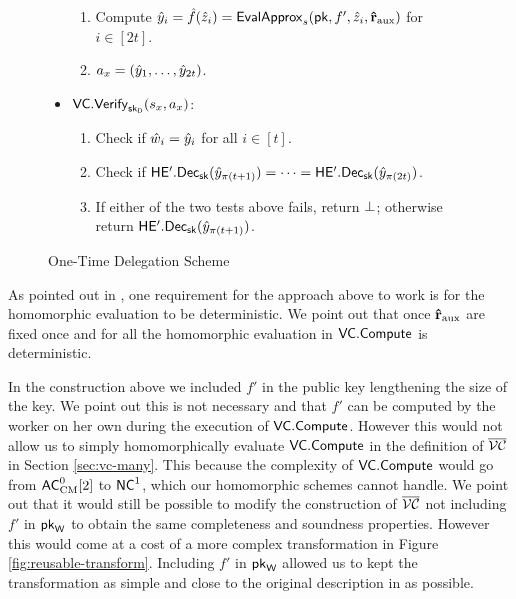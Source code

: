 \begin{figure}
\begin{framed}
\begin{itemize}
\begin{enumerate}
\item Compute $\hat{y}_i = \hat{f}(\hat{z}_i) = \mathsf{EvalApprox}_s(\mathsf{pk}, f', \hat{z}_i, \mathbf{\hat{r}}_{\text{aux}})$ for $i \in [2t]$.
\item $a_x = (\hat{y}_1,\dots,\hat{y}_{2t})$.
\end{enumerate}
\item $\mathsf{VC.Verify}_{\mathsf{sk}_{\mathsf{D}}}(s_x, a_x)$:
\begin{enumerate}
\item Check if $\hat{w}_i = \hat{y}_i$ for all $i \in [t]$.
\item Check if $\mathsf{HE'.Dec}_{\mathsf{sk}}(\hat{y}_{\pi(t+1)}) = \dots = \mathsf{HE'.Dec}_{\mathsf{sk}}(\hat{y}_{\pi(2t)})$.
\item If either of the two tests above fails, return $\bot$; otherwise return $\mathsf{HE'.Dec}_{\mathsf{sk}}(\hat{y}_{\pi(t+1)})$.
\end{enumerate}
\end{itemize}
\end{framed}
\caption{One-Time Delegation Scheme}
\label{fig:one-time}
\end{figure}

\begin{remark}
As pointed out in \cite{ckv10}, one requirement for the approach above to work is for the homomorphic evaluation to be deterministic. We point out that once $\mathbf{\hat{r}}_{\text{aux}}$ are fixed once and for all the homomorphic evaluation in $\mathsf{VC.Compute}$ is deterministic.
\end{remark}

\begin{remark}
In the construction above we included $f'$ in the public key lengthening the size of the key. We point out this is not necessary and that $f'$ can be computed by the worker on her own during the execution of $\mathsf{VC.Compute}$. However this would not allow us to simply homomorphically evaluate $\mathsf{VC.Compute}$ in the definition of $\overline{{\cal VC}}$ in Section \ref{sec:vc-many}. This because the complexity of $\mathsf{VC.Compute}$ would go from ${\mathsf{AC}}^0_{\text{CM}}[2]$ to ${\mathsf{NC}}^1$, which our homomorphic schemes cannot handle.
We point out that it would still be possible to modify the construction of $\overline{{\cal VC}}$  not including $f'$ in $\mathsf{pk}_{\mathsf{W}}$ to obtain the same completeness and soundness properties. However this would come at a cost of a more complex transformation in Figure \ref{fig:reusable-transform}. Including $f'$ in $\mathsf{pk}_{\mathsf{W}}$ allowed us to kept the transformation as simple and close to the original description in \cite{ckv10} as possible. 
\end{remark}


